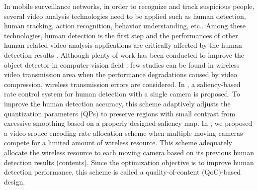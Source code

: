 \documentclass[journal]{IEEEtran}
\begin{document}
In mobile surveillance networks, in order to recognize and track suspicious people, several video analysis technologies need to be applied such as human detection, human tracking, action recognition, behavior understanding, etc.. Among these technologies, human detection is the first step and the performances of other human-related video analysis applications are critically affected by the human detection results \cite{LeHw15}. Although plenty of work has been conducted to improve the object detector in computer vision field \cite{DaTr05,LeLS08,FGMR10}, few studies can be found in wireless video transmission area when the performance degradations caused by video compression, wireless transmission errors are considered. In \cite{MiBR13}, a saliency-based rate control system for human detection with a single camera is proposed. To improve the human detection accuracy, this scheme adaptively adjusts the quantization parameters (QPs) to preserve regions with small contrast from excessive smoothing based on a properly designed saliency map. In \cite{CHLQ15}, we proposed a video srouce encoding rate allocation scheme when multiple moving cameras compete for a limited amount of wireless resource. This scheme adequately allocate the wireless resource to each moving camera based on its previous human detection results (contents). Since the optimization objective is to improve human detection performance, this scheme is called a quality-of-content (QoC)-based design.
\end{document}
